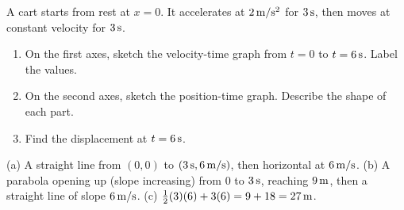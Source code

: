 \begin{exo}{}
A cart starts from rest at $x=0$. It accelerates at $2\,\mathrm{m/s^2}$ for $3\,\mathrm{s}$, then moves at constant velocity for $3\,\mathrm{s}$.
\begin{enumerate}[label=(\alph*)]
\item On the first axes, sketch the velocity-time graph from $t=0$ to $t=6\,\mathrm{s}$. Label the values.
\item On the second axes, sketch the position-time graph. Describe the shape of each part.
\item Find the displacement at $t=6\,\mathrm{s}$.
\end{enumerate}
\begin{minipage}{0.48\linewidth}\end{minipage}\hfill\begin{minipage}{0.48\linewidth}\end{minipage}
\work{2.5cm}
\begin{solution}
(a) A straight line from $(0,0)$ to $(3\,\mathrm{s},6\,\mathrm{m/s})$, then horizontal at $6\,\mathrm{m/s}$. \;(b) A parabola opening up (slope increasing) from $0$ to $3\,\mathrm{s}$, reaching $9\,\mathrm{m}$, then a straight line of slope $6\,\mathrm{m/s}$. \;(c) $\frac12(3)(6)+3(6)=9+18=27\,\mathrm{m}$.
\end{solution}
\end{exo}

